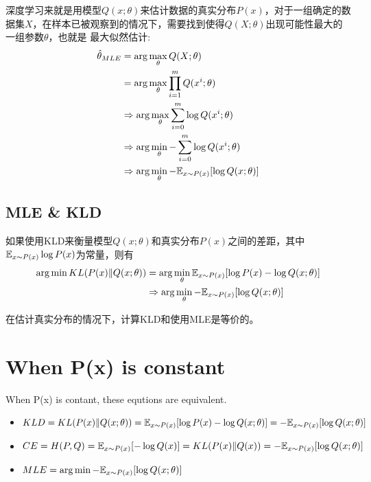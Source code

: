 深度学习来就是用模型$Q(x;\theta)$来估计数据的真实分布$P(x)$，对于一组确定的数据集$X$，在样本已被观察到的情况下，需要找到使得$Q(X; \theta)$出现可能性最大的一组参数$\theta$，也就是
最大似然估计:
\begin{equation}
    \begin{split}
        \hat{\theta}_{MLE}
        &= \arg \max_\theta Q(X; \theta) \\
        &= \arg \max_{\theta} \prod _{i=1}^m Q(x^i; \theta) \\
        &\Rightarrow \arg \max_{\theta} \sum_{i=0}^m \log Q(x^i; \theta) \\
        &\Rightarrow \arg \min_{\theta} - \sum_{i=0}^m \log Q(x^i; \theta) \\
        &\Rightarrow \arg \min_{\theta} - \mathbb{E} _{x \sim P(x)}[\log Q(x; \theta)]
    \end{split}
\end{equation}

\subsection{MLE \& KLD}
如果使用KLD来衡量模型$Q(x;\theta)$和真实分布$P(x)$之间的差距，其中$\mathbb{E}_{x \sim P(x)}\log P(x)$为常量，则有
\begin{equation}
    \begin{split}
    \arg \min KL(P(x)\|Q(x;\theta))
        &= \arg \min_{\theta} \mathbb{E}_{x \sim P(x)}[\log P(x) - \log Q(x;\theta)] \\
        &\Rightarrow \arg \min_{\theta} - \mathbb{E}_{x \sim P(x)}[\log Q(x;\theta)]
    \end{split}
\end{equation}

在估计真实分布的情况下，计算KLD和使用MLE是等价的。

\section{When P(x) is constant}
When P(x) is contant, these equtions are equivalent.
\begin{itemize}
    \item $ KLD = KL(P(x)\|Q(x;\theta)) = \mathbb{E}_{x \sim P(x)}[\log P(x) - \log Q(x; \theta)] = - \mathbb{E}_{x \sim P(x)}[\log Q(x;\theta)] $
    \item $ CE = H(P, Q) = \mathbb{E}_{x \sim P(x)}[- \log Q(x)] = KL(P(x)\|Q(x)) = - \mathbb{E}_{x \sim P(x)}[\log Q(x;\theta)] $
    \item $ MLE = \arg \min - \mathbb{E} _{x \sim P(x)}[\log Q(x; \theta)]$
\end{itemize}

